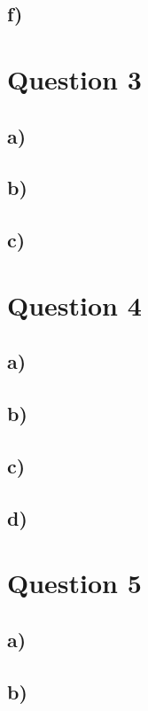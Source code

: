 \documentclass{article}
\begin{document}
\subsection{f)}

\section{Question 3}
\subsection{a)}
\subsection{b)}
\subsection{c)}

\section{Question 4}
\subsection{a)}
\subsection{b)}
\subsection{c)}
\subsection{d)}

\section{Question 5}
\subsection{a)}
\subsection{b)}
\end{document}
